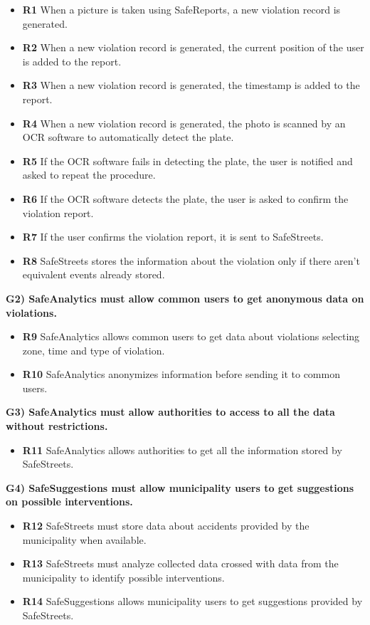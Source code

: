 \documentclass[a4paper]{article}
\begin{document}
\begin{itemize}
\item
  \textbf{R1} When a picture is taken using SafeReports, a new violation
  record is generated.
\item
  \textbf{R2} When a new violation record is generated, the current
  position of the user is added to the report.
\item
  \textbf{R3} When a new violation record is generated, the timestamp is
  added to the report.
\item
  \textbf{R4} When a new violation record is generated, the photo is
  scanned by an OCR software to automatically detect the plate.
\item
  \textbf{R5} If the OCR software fails in detecting the plate, the user
  is notified and asked to repeat the procedure.
\item
  \textbf{R6} If the OCR software detects the plate, the user is asked
  to confirm the violation report.
\item
  \textbf{R7} If the user confirms the violation report, it is sent to
  SafeStreets.
\item
  \textbf{R8} SafeStreets stores the information about the violation
  only if there aren't equivalent events already stored.
\end{itemize}

\textbf{G2) SafeAnalytics must allow common users to get anonymous data
on violations.}

\begin{itemize}
\item
  \textbf{R9} SafeAnalytics allows common users to get data about
  violations selecting zone, time and type of violation.
\item
  \textbf{R10} SafeAnalytics anonymizes information before sending it to
  common users.
\end{itemize}

\textbf{G3) SafeAnalytics must allow authorities to access to all the
data without restrictions.}

\begin{itemize}
\item
  \textbf{R11} SafeAnalytics allows authorities to get all the information
  stored by SafeStreets.
\end{itemize}

\textbf{G4) SafeSuggestions must allow municipality users to get
suggestions on possible interventions.}

\begin{itemize}
\item
  \textbf{R12} SafeStreets must store data about accidents provided by
  the municipality when available.
\item
  \textbf{R13} SafeStreets must analyze collected data crossed with data
  from the municipality to identify possible interventions.
\item
  \textbf{R14} SafeSuggestions allows municipality users to get
  suggestions provided by SafeStreets.
\end{itemize}
\end{document}
